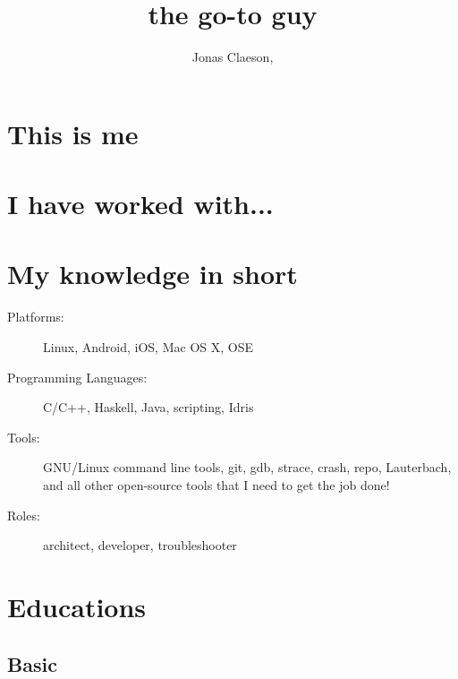 \documentclass[ DIV=calc,%
                paper=a4,%
                fontsize=11pt,%
                twocolumn]{scrartcl}
\title{the go-to guy}
\author{Jonas Claeson, }
\date{}
\begin{document}
\maketitle
\thispagestyle{fancy}


\section*{This is me}


\vfill\null

\section*{I have worked with...}

\begin{description}











\end{description}

\section*{My knowledge in short}

\begin{description}
    \item[Platforms:] Linux, Android, iOS, Mac OS X, OSE
    \item[Programming Languages:] C/C++, Haskell, Java, scripting, Idris
    \item[Tools:] GNU/Linux command line tools, git, gdb, strace, crash, repo, Lauterbach, and all other open-source tools that I need to get the job done!
    \item[Roles:] architect, developer, troubleshooter
\end{description}

\section*{Educations}

\subsection*{Basic}
\end{document}
